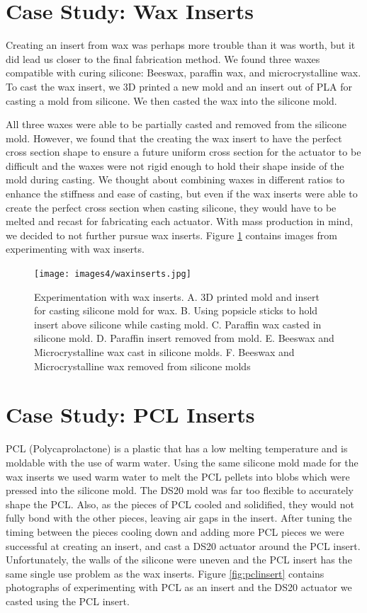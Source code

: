 \section{Case Study: Wax Inserts}
Creating an insert from wax was perhaps more trouble than it was worth, but it did lead us closer to the final fabrication method. We found three waxes compatible with curing silicone: Beeswax, paraffin wax, and microcrystalline wax. To cast the wax insert, we 3D printed a new mold and an insert out of PLA for casting a mold from silicone. We then casted the wax into the silicone mold. 

All three waxes were able to be partially casted and removed from the silicone mold. However, we found that the creating the wax insert to have the perfect cross section shape to ensure a future uniform cross section for the actuator to be difficult and the waxes were not rigid enough to hold their shape inside of the mold during casting. We thought about combining waxes in different ratios to enhance the stiffness and ease of casting, but even if the wax inserts were able to create the perfect cross section when casting silicone, they would have to be melted and recast for fabricating each actuator. With mass production in mind, we decided to not further pursue wax inserts. Figure \ref{fig:waxinserts} contains images from experimenting with wax inserts. 

\begin{figure}[h]
    \centering
    \texttt{[image: images4/waxinserts.jpg]}
    \caption{Experimentation with wax inserts. A. 3D printed mold and insert for casting silicone mold for wax. B. Using popsicle sticks to hold insert above silicone while casting mold. C. Paraffin wax casted in silicone mold. D. Paraffin insert removed from mold. E. Beeswax and Microcrystalline wax cast in silicone molds. F. Beeswax and Microcrystalline wax removed from silicone molds}
    \label{fig:waxinserts}
\end{figure}

\section{Case Study: PCL Inserts}

PCL (Polycaprolactone) is a plastic that has a low melting temperature and is moldable with the use of warm water. Using the same silicone mold made for the wax inserts we used warm water to melt the PCL pellets into blobs which were pressed into the silicone mold. The DS20 mold was far too flexible to accurately shape the PCL. Also, as the pieces of PCL cooled and solidified, they would not fully bond with the other pieces, leaving air gaps in the insert. After tuning the timing between the pieces cooling down and adding more PCL pieces we were successful at creating an insert, and cast a DS20 actuator around the PCL insert. Unfortunately, the walls of the silicone were uneven and the PCL insert has the same single use problem as the wax inserts. Figure \ref{fig:pclinsert} contains photographs of experimenting with PCL as an insert and the DS20 actuator we casted using the PCL insert. 

